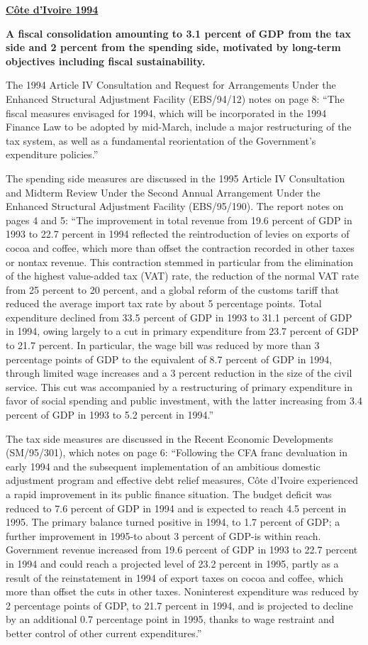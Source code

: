 \textbf{\underline{Côte d'Ivoire 1994}}  

\textbf{A fiscal consolidation amounting to 3.1 percent of GDP from the tax side and 2 percent from the spending side, motivated by long-term objectives including fiscal sustainability.}

The 1994 Article IV Consultation and Request for Arrangements Under the Enhanced Structural Adjustment Facility (EBS/94/12) notes on page 8: “The fiscal measures envisaged for 1994, which will be incorporated in the 1994 Finance Law to be adopted by mid-March, include a major restructuring of the tax system, as well as a fundamental reorientation of the Government's expenditure policies.”

The spending side measures are discussed in the 1995 Article IV Consultation and Midterm Review Under the Second Annual Arrangement Under the Enhanced Structural Adjustment Facility (EBS/95/190). The report notes on pages 4 and 5: “The improvement in total revenue from 19.6 percent of GDP in 1993 to 22.7 percent in 1994 reflected the reintroduction of levies on exports of cocoa and coffee, which more than offset the contraction recorded in other taxes or nontax revenue. This contraction stemmed in particular from the elimination of the highest value-added tax (VAT) rate, the reduction of the normal VAT rate from 25 percent to 20 percent, and a global reform of the customs tariff that reduced the average import tax rate by about 5 percentage points. Total expenditure declined from 33.5 percent of GDP in 1993 to 31.1 percent of GDP in 1994, owing largely to a cut in primary expenditure from 23.7 percent of GDP to 21.7 percent. In particular, the wage bill was reduced by more than 3 percentage points of GDP to the equivalent of 8.7 percent of GDP in 1994, through limited wage increases and a 3 percent reduction in the size of the civil service. This cut was accompanied by a restructuring of primary expenditure in favor of social spending and public investment, with the latter increasing from 3.4 percent of GDP in 1993 to 5.2 percent in 1994.”

The tax side measures are discussed in the Recent Economic Developments (SM/95/301), which notes on page 6: “Following the CFA franc devaluation in early 1994 and the subsequent implementation of an ambitious domestic adjustment program and effective debt relief measures, Côte d'Ivoire experienced a rapid improvement in its public finance situation. The budget deficit was reduced to 7.6 percent of GDP in 1994 and is expected to reach 4.5 percent in 1995. The primary balance turned positive in 1994, to 1.7 percent of GDP; a further improvement in 1995-to about 3 percent of GDP-is within reach. Government revenue increased from 19.6 percent of GDP in 1993 to 22.7 percent in 1994 and could reach a projected level of 23.2 percent in 1995, partly as a result of the reinstatement in 1994 of export taxes on cocoa and coffee, which more than offset the cuts in other taxes. Noninterest expenditure was reduced by 2 percentage points of GDP, to 21.7 percent in 1994, and is projected to decline by an additional 0.7 percentage point in 1995, thanks to wage restraint and better control of other current expenditures.”

